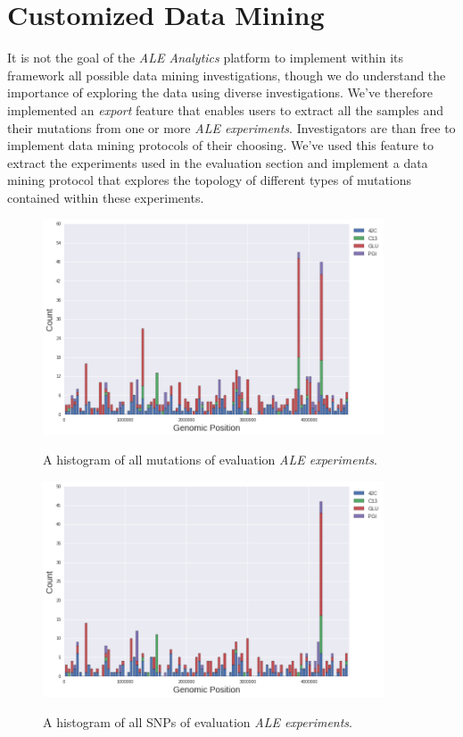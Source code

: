 \documentclass[12pt,final,masters,chapterheads]{ucsd}  %
\begin{document}
\section{Customized Data Mining}
It is not the goal of the \textit{ALE Analytics} platform to implement within its framework all possible data mining investigations, though we do understand the importance of exploring the data using diverse investigations. We've therefore implemented an \textit{export} feature that enables users to extract all the samples and their mutations from one or more \textit{ALE experiments}. Investigators are than free to implement data mining protocols of their choosing. We've used this feature to extract the experiments used in the evaluation section and implement a data mining protocol that explores the topology of different types of mutations contained within these experiments.
\begin{figure}[H]
  \caption{A histogram of all mutations of evaluation \textit{ALE experiments}.}
  \centering
  \includegraphics[width=0.9\textwidth]{all_muts_topo.png}
  \label{fig:all_muts_topo}
\end{figure}
\begin{figure}[H]
  \caption{A histogram of all SNPs of evaluation \textit{ALE experiments}.}
  \centering
  \includegraphics[width=0.9\textwidth]{all_snps_topo.png}
  \label{fig:all_snps_topo}
\end{figure}
\end{document}
